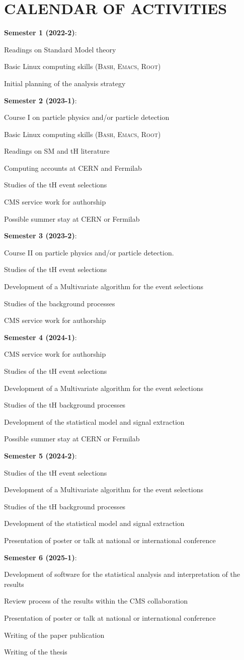 \documentclass[final,3p]{CSP}
\newcommand{\SubItem}[1]{
    {\setlength\itemindent{15pt} \item[-] #1}
}
\begin{document}
\section{CALENDAR OF ACTIVITIES}
\onehalfspacing
\begin{itemize}
\item {\bf Semester 1 (2022-2)}:
  \SubItem{ Readings on Standard Model theory}
  \SubItem{ Basic Linux computing skills (\textsc{Bash, Emacs, Root})}
  \SubItem{ Initial planning of the analysis strategy}
\item {\bf Semester 2 (2023-1)}:
  \SubItem{ Course I on particle physics and/or particle detection}
  \SubItem{ Basic Linux computing skills (\textsc{Bash, Emacs, Root})}
  \SubItem{ Readings on SM and tH literature}
  \SubItem{ Computing accounts at CERN and Fermilab}
  \SubItem{ Studies of the tH event selections}
  \SubItem{ CMS service work for authorship}
  \SubItem{ Possible summer stay at CERN or Fermilab}
\item {\bf Semester 3 (2023-2)}:
  \SubItem{ Course II on particle physics and/or particle detection.}
  \SubItem{ Studies of the tH event selections}
  \SubItem{ Development of a Multivariate algorithm for the event selections}
  \SubItem{ Studies of the background processes}
  \SubItem{ CMS service work for authorship}
\item {\bf Semester 4 (2024-1)}:
  \SubItem{ CMS service work for authorship}
  \SubItem{ Studies of the tH event selections}
  \SubItem{ Development of a Multivariate algorithm for the event selections}
  \SubItem{ Studies of the tH background processes}
  \SubItem{ Development of the statistical model and signal extraction}
  \SubItem{ Possible summer stay at CERN or Fermilab}
\item {\bf Semester 5 (2024-2)}:
  \SubItem{ Studies of the tH event selections}
  \SubItem{ Development of a Multivariate algorithm for the event selections}
  \SubItem{ Studies of the tH background processes}
  \SubItem{ Development of the statistical model and signal extraction}
  \SubItem{ Presentation of poster or talk at national or international conference}
\item {\bf Semester 6 (2025-1)}:
  \SubItem{ Development of software for the statistical analysis and interpretation of the results}
  \SubItem{ Review process of the results within the CMS collaboration}
  \SubItem{ Presentation of poster or talk at national or international conference}
  \SubItem{ Writing of the paper publication}
  \SubItem{ Writing of the thesis}
\end{itemize}





\cleardoublepage
\onehalfspacing


\end{document}
